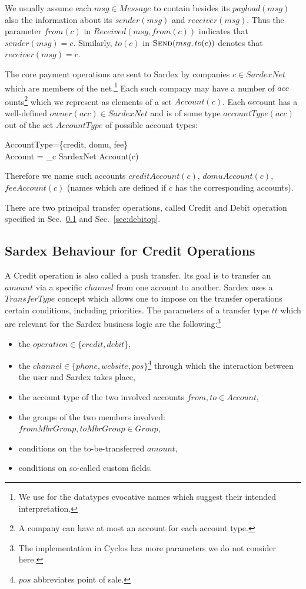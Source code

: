 We usually assume  each $msg \in Message$ to contain besides its $payload(msg)$ also the information about its $sender(msg)$ and $receiver(msg)$. Thus the parameter $from(c)$ in $Received(msg, from(c))$ indicates that $sender(msg)=c$. Similarly, $to(c)$ in $\hbox{\sc Send}(msg, to(c))$ denotes that $receiver(msg) = c$.

The core payment operations are sent to Sardex by companies $c \in SardexNet$ which are members of the net.\footnote{We use for the datatypes evocative names which suggest their intended interpretation.} Each such company may have a number of $acc$ounts\footnote{A company can have at most an account for each account type.} which we represent as elements of a set $Account(c)$. Each $acc$ount has a well-defined $owner(acc) \in SardexNet$ and is of some type $accountType(acc)$ out of the set $AccountType$ of possible account types:

\begin{asm}
AccountType=\{credit, domu, fee\} \\
Account = \bigcup_{c \in SardexNet} Account(c)
\end{asm}
Therefore we name such accounts $creditAccount(c)$, $domuAccount(c)$, $feeAccount(c)$ (names which are defined if $c$ has the corresponding accounts). 

There are two principal transfer operations, called Credit and Debit operation specified in Sec.~\ref{sec:creditop} and Sec.~\ref{sec:debitop}.

\subsection{Sardex Behaviour for Credit Operations}
\label{sec:creditop}

A Credit operation is also called a push transfer. Its goal is to transfer an $amount$ via a specific $channel$ from one account to another. Sardex uses a $TransferType$ concept which allows one to impose on the transfer operations certain conditions, including priorities. The parameters of a transfer type $tt$ which are relevant for the Sardex business logic are the following:\footnote{The implementation in Cyclos has more parameters we do not consider here.}
\begin{itemize}
	\item the $operation \in \{credit, debit\}$,
	\item the $channel \in \{phone,website,pos\}$\footnote{$pos$ abbreviates point of sale.} through which the interaction between the user and Sardex takes place,
	\item the account type of the two involved accounts $from,to \in Account$,
	\item the groups of the two members involved: $fromMbrGroup,toMbrGroup \in Group$,
	\item conditions on the to-be-transferred $amount$, 
	\item conditions on so-called custom fields.
\end{itemize}

